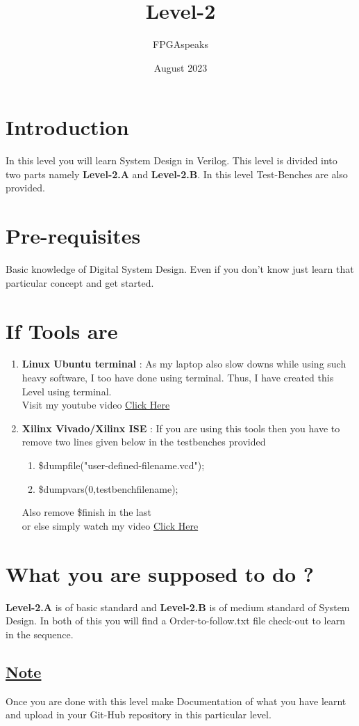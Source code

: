 \documentclass{article}
\title{\huge {\textbf{Level-2}}}
\author{FPGAspeaks}
\date{August 2023}
\begin{document}
\maketitle

\section{Introduction}
In this level you will learn System Design in Verilog. This level is divided into two parts namely
\textbf{Level-2.A} and \textbf{Level-2.B}. In this level Test-Benches are also provided.
\section{Pre-requisites}
Basic knowledge of Digital System Design. Even if you don't know just learn that particular concept and get started.
\section{If Tools are}
\begin{enumerate}
    \item \textbf{Linux Ubuntu terminal }: As my laptop also slow downs while using such heavy software, I too have done using terminal. Thus, I have created this Level using terminal.\\
    Visit my youtube video \href{https://youtu.be/92rmMcu5vGQ}{Click Here}
     \item \textbf{Xilinx Vivado/Xilinx ISE }: If you are using this tools then you have to remove two lines given below in the testbenches provided
     \begin{enumerate}
         \item \$dumpfile("user-defined-filename.vcd");
         \item \$dumpvars(0,testbenchfilename);
     \end{enumerate}
     Also remove \$finish in the last\\
     or else simply watch my video \href{https://www.youtube.com/watch?v=-aOc2moMT_I}{Click Here} 
\end{enumerate}
\section{What you are supposed to do ? }
\textbf{Level-2.A} is of basic standard and \textbf{Level-2.B} is of medium standard of System Design. In both of this you will find a Order-to-follow.txt file check-out to learn in the sequence. 
\subsection{\underline{Note}} Once you are done with this level make Documentation of what you have learnt and upload in your Git-Hub repository in this particular level. 
\end{document}
